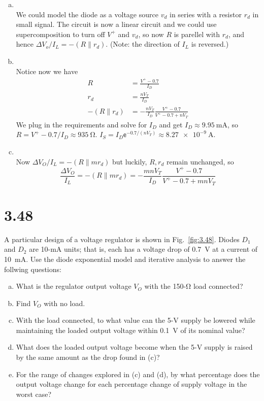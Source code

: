 \documentclass[12pt, a4paper]{article}
\newcommand{\ex}{\mathsf{e}}
\theoremstyle{mystyle}	%
\newcommand{\Ans}{\noindent{\bf Ans:}}
\begin{document}
\begin{enumerate}[(a)]
  \item \Ans \\
    We could model the diode as a voltage source $v_d$ in series with
    a resistor $r_d$ in small signal. The circuit is now a linear circuit
    and we could use supercomposition to turn off $V^+$ and $v_d$, so now
    $R$ is parellel with $r_d$, and hence 
    $\Delta V_o / I_L = -(R \parallel r_d)$.
    (Note: the direction of $I_L$ is reversed.)
  \item \Ans \\
    Notice now we have
    \begin{align*}
      R &= \frac{V^+ - 0.7}{I_D} \\
      r_d &= \frac{nV_T}{I_D} \\
      -(R \parallel r_d) &= -\frac{nV_T}{I_D} \frac{V^+ - 0.7}{V^+ - 0.7 + nV_T }
    \end{align*}
    We plug in the requirements and solve for $I_D$ and get
    $I_D \approx \SI{9.95}\mA$, so $R = V^+ - 0.7 / I_D \approx \SI{935}\ohm$.
    $I_S = I_D \ex^{-0.7/(nV_T)} \approx \SI{8.27e-9}\A$.
  \item \Ans \\
    Now $\Delta V_O / I_L = -(R \parallel m r_d)$ but luckily, $R, r_d$ remain unchanged, so 
    \[
      \frac{\Delta V_O}{I_L} = -(R \parallel m r_d) =
      -\frac{mnV_T}{I_D} \frac{V^+ - 0.7}{V^+ - 0.7 + mnV_T }
    \]
\end{enumerate}


\section{3.48}
A particular design of a voltage regulator is shown in Fig.~\ref{fig:3.48}.
Diodes $D_1$ and $D_2$ are 10-\si{\mA} units; that is,
each has a voltage drop of \SI{0.7}{\V} at a current of
\SI{10}{\mA}. Use the diode exponential model and iterative
analysis to answer the follwing questions:
\begin{enumerate}[(a)]
  \item What is the regulator output voltage $V_O$ with the
    150-\si{\ohm} load connected?
  \item Find $V_O$ with no load.
  \item With the load connected, to what value can the 5-\si{\V}
    supply be lowered while maintaining the loaded output voltage
    within \SI{0.1}{\V} of its nominal value?
  \item What does the loaded output voltage become when the 5-\si{\V}
    supply is raised by the same amount as the drop found in (c)?
  \item For the range of changes explored in (c) and (d), by what
    percentage does the output voltage change for each percentage
    change of supply voltage in the worst case?
\end{enumerate}
\end{document}
